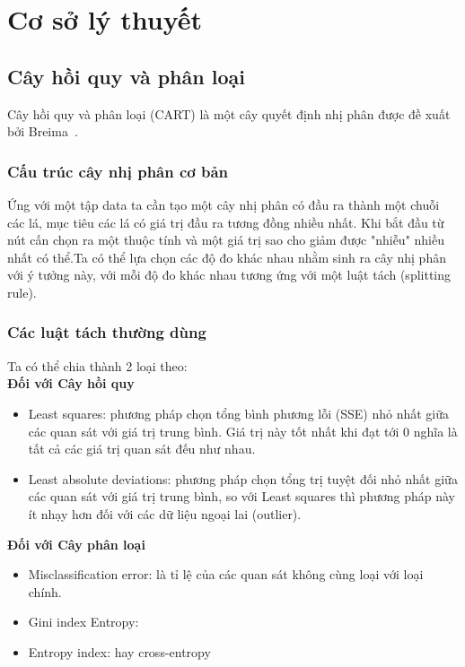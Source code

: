 \chapter{Cơ sở lý thuyết}
\section{Cây hồi quy và phân loại}
Cây hồi quy và phân loại (CART) là một cây quyết định nhị phân được đề xuất bởi Breima~\cite{1}.\\

\subsection{Cấu trúc cây nhị phân cơ bản}
 Ứng  với một tập data ta cần tạo một  cây nhị phân có đầu ra thành một chuỗi các lá, mục tiêu các lá có giá trị đầu ra tương đồng nhiều nhất. Khi bắt đầu từ nút cấn chọn ra một thuộc tính và một giá trị sao cho giảm được "nhiễu" nhiều nhất có thể.Ta có thể lựa chọn các độ đo khác nhau nhằm sinh ra cây nhị phân với ý tưởng này, với mỗi độ đo khác nhau tương ứng với một luật tách (splitting rule).\\
\subsection{Các luật tách thường dùng} Ta có thể chia thành 2 loại theo:\\
\textbf{Đối với Cây hồi quy} %
\begin{itemize}
\item Least squares: phương pháp chọn tổng bình phương lỗi (SSE) nhỏ nhất giữa các quan sát với giá trị trung bình. Giá trị này tốt nhất khi đạt tới 0 nghĩa là tất cả các giá trị quan sát đếu như nhau.
\item Least absolute deviations: phương pháp chọn tổng  trị tuyệt đối nhỏ nhất giữa các quan sát với giá trị trung bình, so với Least squares thì phương pháp này ít nhạy hơn đối với các dữ liệu ngoại lai (outlier). 
\end{itemize}
\textbf{Đối với Cây phân loại} %
\begin{itemize}
\item Misclassification error: là tỉ lệ của các quan sát không cùng loại với loại chính. 
\item Gini index  Entropy: %
\item Entropy index: hay cross-entropy %
\end{itemize}

